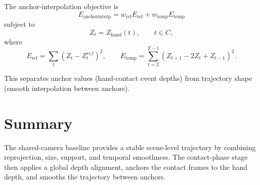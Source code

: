 \documentclass[11pt]{article}
\begin{document}
The anchor-interpolation objective is
\[
E_{\text{anchorinterp}}
= w_{\text{ref}} E_{\text{ref}}
+ w_{\text{temp}} E_{\text{temp}}
\]
subject to
\[
Z_t = Z_{\text{hand}}(t), \qquad t \in C,
\]
where
\[
E_{\text{ref}} = \sum_t (Z_t - Z_t^{ref})^2,
\qquad
E_{\text{temp}} = \sum_{t=2}^{T-1} (Z_{t+1} - 2Z_t + Z_{t-1})^2.
\]

This separates anchor values (hand-contact event depths) from trajectory shape (smooth interpolation between anchors).

\section{Summary}

The shared-camera baseline provides a stable scene-level trajectory by combining reprojection, size, support, and temporal smoothness. The contact-phase stage then applies a global depth alignment, anchors the contact frames to the hand depth, and smooths the trajectory between anchors.
\end{document}

